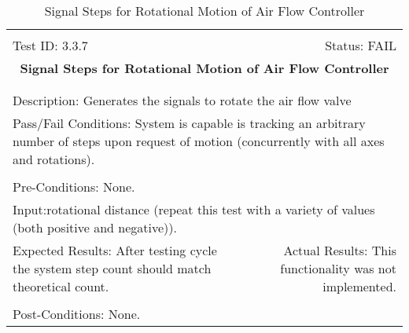 \documentclass[titlepage]{article}
\begin{document}
\begin{center}
\begin{table}[h!]
\begin{tabular}{|l r|}\hline&\\[-2mm]
	Test ID: 3.3.7	&Status: FAIL\\[-3mm]
	\multicolumn{2}{|c|}{\textbf{\large{Signal Steps for Rotational Motion of Air Flow Controller}}}\\&\\\hline&\\[-3mm]
	\multicolumn{2}{|p{\textwidth}|}{Description: Generates the signals to rotate the air flow valve}\\\hline
	\multicolumn{2}{|p{\textwidth}|}{Pass/Fail Conditions: System is capable is tracking an arbitrary number of steps upon request of motion (concurrently with all axes and rotations).}\\[1mm]\hline&\\[-3mm]
	\multicolumn{2}{|p{\textwidth}|}{Pre-Conditions: None.}\\[4mm]
	\multicolumn{2}{|p{\textwidth}|}{Input:rotational distance (repeat this test with a variety of values (both positive and negative)).}\\[2mm]\hline
	\multicolumn{1}{|p{0.49\textwidth}}{Expected Results: After testing cycle the system step count should match theoretical count.}	&\multicolumn{1}{|p{0.45\textwidth}|}{Actual Results: This functionality was not implemented.}\\\hline&\\[-3mm]
	\multicolumn{2}{|p{\textwidth}|}{Post-Conditions: None.}\\\hline
\end{tabular}
\caption{Signal Steps for Rotational Motion of Air Flow Controller}
\end{table}
\end{center}
\newpage
\end{document}
